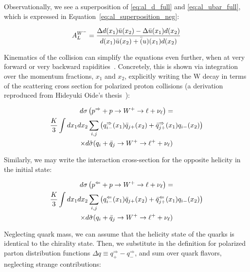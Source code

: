 Observationally, we see a superposition of \ref{eq:al_d_full} and
\ref{eq:al_ubar_full}, which is expressed in
Equation~\ref{eq:al_superposition_neg}:

\begin{equation}
  {A_L^{W^-}} = 
  {
    {
      \Delta d(x_1)\bar{u}(x_2)-\Delta \bar{u}(x_1)d(x_2)
    }
    \over
    {
      d(x_1)\bar u(x_2)+\bar(u)(x_1)d(x_2)
    }
  }
  \label{eq:al_superposition_neg}
\end{equation}

Kinematics of the collision can simplify the equations even further, when at
very forward or very backward rapidities~\cite{Aidala2005}. Concretely, this is
shown via integration over the momentum fractions, $x_1$ and $x_2$, explicitly
writing the W decay in terms of the scattering cross section for polarized
proton collisions (a derivation reproduced from Hideyuki Oide's
thesis~\cite{Oide2012}):

\begin{multline}
  {
    d\sigma
    \left(
      p^{\Rightarrow}+p\rightarrow W^+\rightarrow \ell+\nu_{\ell}
    \right)
  } 
  = \\
  {
    {K\over3}\int dx_1dx_2\sum_{i,j}
    \left(
    q_{i-}^\Rightarrow(x_1)\bar{q}_{j+}(x_2) +
    \bar{q}_{j+}^\Rightarrow(x_1)q_{i-}(x_2)
    \right)
  }  \\
  \times
  {
    d\hat{\sigma}(q_i+\bar{q}_j\rightarrow W^+\rightarrow \ell^+ + \nu_{\ell})
  }
\end{multline}

{\noindent}Similarly, we may write the interaction cross-section for the
opposite helicity in the initial state:

\begin{multline}
  {
    d\sigma
    \left(
      p^{\Leftarrow}+p\rightarrow W^+\rightarrow \ell+\nu_{\ell}
    \right)
  } 
  = \\
  {
    {K\over3}\int dx_1dx_2\sum_{i,j}
    \left(
    q_{i-}^\Leftarrow(x_1)\bar{q}_{j+}(x_2) +
    \bar{q}_{j+}^\Leftarrow(x_1)q_{i-}(x_2)
    \right)
  }  \\
  \times
  {
    d\hat{\sigma}(q_i+\bar{q}_j\rightarrow W^+\rightarrow \ell^+ + \nu_{\ell})
  }
\end{multline}

Neglecting quark mass, we can assume that the helicity state of the quarks is
identical to the chirality state. Then, we substitute in the definition for
polarized parton distribution functions $\Delta q \equiv q_{+}^{\Rightarrow} -
q_{-}^{\Rightarrow}$, and sum over quark flavors, neglecting strange
contributions:

